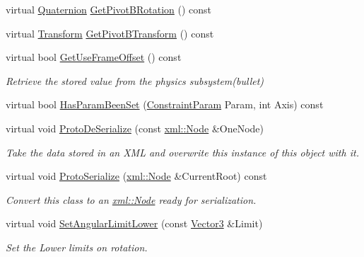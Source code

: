 \begin{DoxyCompactItemize}
\item 
virtual \hyperlink{classMezzanine_1_1Quaternion}{Quaternion} \hyperlink{classMezzanine_1_1Generic6DofConstraint_ab3979edc1d5f3bfce878de009c18494d}{GetPivotBRotation} () const 
\item 
virtual \hyperlink{classMezzanine_1_1Transform}{Transform} \hyperlink{classMezzanine_1_1Generic6DofConstraint_ad38e140ea8edf8d9d74e99bbebf68417}{GetPivotBTransform} () const 
\item 
virtual bool \hyperlink{classMezzanine_1_1Generic6DofConstraint_ada22ae842e9212b0480bbfa866d16a08}{GetUseFrameOffset} () const 
\begin{DoxyCompactList}\small\item\em Retrieve the stored value from the physics subsystem(bullet) \item\end{DoxyCompactList}\item 
virtual bool \hyperlink{classMezzanine_1_1Generic6DofConstraint_ac0589ecb2fe1e0227dbcbb52cd90ceba}{HasParamBeenSet} (\hyperlink{namespaceMezzanine_a6c62e8c2938fb203eb7a7072c12176f4}{ConstraintParam} Param, int Axis) const 
\item 
virtual void \hyperlink{classMezzanine_1_1Generic6DofConstraint_ae165de381e73cc5119d07e3fc563aa99}{ProtoDeSerialize} (const \hyperlink{classMezzanine_1_1xml_1_1Node}{xml::Node} \&OneNode)
\begin{DoxyCompactList}\small\item\em Take the data stored in an XML and overwrite this instance of this object with it. \item\end{DoxyCompactList}\item 
virtual void \hyperlink{classMezzanine_1_1Generic6DofConstraint_a6595599905cd8b51440bf868d4a9806a}{ProtoSerialize} (\hyperlink{classMezzanine_1_1xml_1_1Node}{xml::Node} \&CurrentRoot) const 
\begin{DoxyCompactList}\small\item\em Convert this class to an \hyperlink{classMezzanine_1_1xml_1_1Node}{xml::Node} ready for serialization. \item\end{DoxyCompactList}\item 
virtual void \hyperlink{classMezzanine_1_1Generic6DofConstraint_af5f946926bb5f47936dc84213b40ec95}{SetAngularLimitLower} (const \hyperlink{classMezzanine_1_1Vector3}{Vector3} \&Limit)
\begin{DoxyCompactList}\small\item\em Set the Lower limits on rotation. \item\end{DoxyCompactList}\item 

\end{DoxyCompactItemize}
